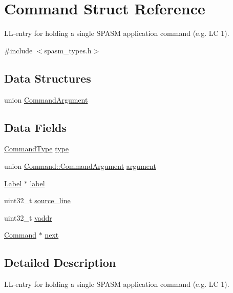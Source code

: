 \hypertarget{struct_command}{\section{\-Command \-Struct \-Reference}
\label{struct_command}
}


\-L\-L-\/entry for holding a single \-S\-P\-A\-S\-M application command (e.\-g. \-L\-C 1).  




{\ttfamily \#include $<$spasm\-\_\-types.\-h$>$}

\subsection*{\-Data \-Structures}
\begin{DoxyCompactItemize}
\item 
union \hyperlink{union_command_1_1_command_argument}{\-Command\-Argument}
\end{DoxyCompactItemize}
\subsection*{\-Data \-Fields}
\begin{DoxyCompactItemize}
\item 
\hyperlink{spasm__types_8h_a21e038f5b8958e203d28bc4f18472352}{\-Command\-Type} \hyperlink{struct_command_afd23b7e189739dbae6c0f2e93ba02c81}{type}
\item 
union \hyperlink{union_command_1_1_command_argument}{\-Command\-::\-Command\-Argument} \hyperlink{struct_command_aaccdf5b1e595a63e70012506fd31122c}{argument}
\item 
\hyperlink{struct_label}{\-Label} $\ast$ \hyperlink{struct_command_a928d3057e62c334c92ecc9aa9d90980b}{label}
\item 
uint32\-\_\-t \hyperlink{struct_command_a3e96525aafdcdfeb775c30f5f334efce}{source\-\_\-line}
\item 
uint32\-\_\-t \hyperlink{struct_command_aa969b498ef234bfdfcc3b98da28e12a3}{vaddr}
\item 
\hyperlink{struct_command}{\-Command} $\ast$ \hyperlink{struct_command_af9c9ea6f57adad15eb7af71d6834d0b4}{next}
\end{DoxyCompactItemize}


\subsection{\-Detailed \-Description}
\-L\-L-\/entry for holding a single \-S\-P\-A\-S\-M application command (e.\-g. \-L\-C 1). 

